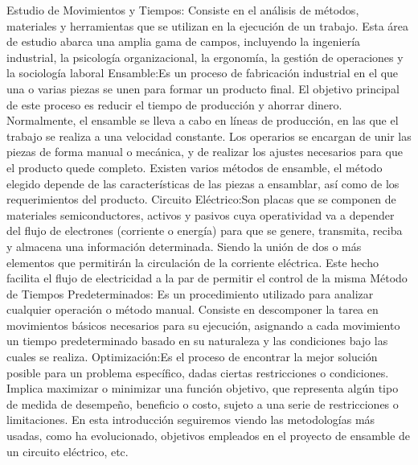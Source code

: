     Estudio de Movimientos y Tiempos: Consiste  en el análisis de métodos, materiales y herramientas que se utilizan en la ejecución de un trabajo. Esta área de estudio abarca una amplia gama de campos, incluyendo la ingeniería industrial, la psicología organizacional, la ergonomía, la gestión de operaciones y la sociología laboral\cite{carlos2016ingenieria}
    Ensamble:Es un proceso de fabricación industrial en el que una o varias piezas se unen para formar un producto final. El objetivo principal de este proceso es reducir el tiempo de producción y ahorrar dinero.
    Normalmente, el ensamble se lleva a cabo en líneas de producción, en las que el trabajo se realiza a una velocidad constante. Los operarios se encargan de unir las piezas de forma manual o mecánica, y de realizar los ajustes necesarios para que el producto quede completo.
    Existen varios métodos de ensamble, el método elegido depende de las características de las piezas a ensamblar, así como de los requerimientos del producto.
    Circuito Eléctrico:Son placas que se componen de materiales semiconductores, activos y pasivos cuya operatividad va a depender del flujo de electrones (corriente o energía) para que se  genere, transmita, reciba y almacena una información determinada. Siendo  la unión de dos o más elementos que permitirán la circulación de la corriente eléctrica. Este hecho facilita el flujo de electricidad a la par de permitir el control de la misma
    Método de Tiempos Predeterminados: Es un procedimiento utilizado para analizar cualquier operación o método manual. Consiste en descomponer la tarea en movimientos básicos necesarios para su ejecución, asignando a cada movimiento un tiempo predeterminado basado en su naturaleza y las condiciones bajo las cuales se realiza.
    Optimización:Es el proceso de encontrar la mejor solución posible para un problema específico, dadas ciertas restricciones o condiciones. Implica maximizar o minimizar una función objetivo, que representa algún tipo de medida de desempeño, beneficio o costo, sujeto a una serie de restricciones o limitaciones. En esta introducción seguiremos viendo las metodologías más usadas, como ha evolucionado, objetivos empleados en el  proyecto de ensamble de un circuito eléctrico, etc.
